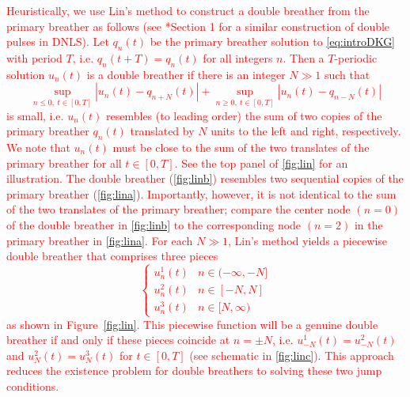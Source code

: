 \documentclass[12pt,reqno]{amsart}
\theoremstyle{definition}
\newcommand{\revised}[1]{ \textcolor{red}{#1} }
\begin{document}
\revised{
Heuristically, we use Lin's method to construct a double breather from the primary breather as follows (see \cite{Parker2020}*{Section 1} for a similar construction of double pulses in DNLS). Let $q_n(t)$ be the primary breather solution to \cref{eq:introDKG} with period $T$, i.e. $q_n(t+T) = q_n(t)$ for all integers $n$. Then a $T$-periodic solution $u_n(t)$ is a double breather if there is an integer $N\gg 1$ such that
\[
\sup_{n\leq 0,\:t\in[0,T]} |u_n(t) - q_{n+N}(t)| + \sup_{n\geq0,\:t\in[0,T]} |u_n(t) - q_{n-N}(t)|
\]
is small, i.e. $u_n(t)$ resembles (to leading order) the sum of two copies of the primary breather $q_n(t)$ translated by $N$ units to the left and right, respectively. We note that $u_n(t)$ must be close to the sum of the two translates of the primary breather for all $t \in [0,T]$. See the top panel of \cref{fig:lin} for an illustration. The double breather (\cref{fig:linb}) resembles two sequential copies of the primary breather (\cref{fig:lina}). Importantly, however, it is not identical to the sum of the two translates of the primary breather; compare the center node $(n=0)$ of the double breather in \cref{fig:linb} to the corresponding node $(n=2)$ in the primary breather in \cref{fig:lina}. For each $N\gg1$, Lin's method yields a piecewise double breather that comprises three pieces
\begin{equation}\label{eq:piecewisebreather}
\begin{cases}
u_n^1(t) & n \in (-\infty, -N] \\
u_n^2(t) & n \in [-N, N] \\
u_n^3(t) & n \in [N, \infty)
\end{cases}
\end{equation}
as shown in Figure~\ref{fig:lin}. This piecewise function will be a genuine double breather if and only if these pieces coincide at $n=\pm N$, i.e. $u_{-N}^1(t) = u_{-N}^2(t)$ and $u_{N}^2(t) = u_{N}^3(t)$ for $t \in [0,T]$ (see schematic in \cref{fig:linc}). This approach reduces the existence problem for double breathers to solving these two jump conditions. 
}
\end{document}
